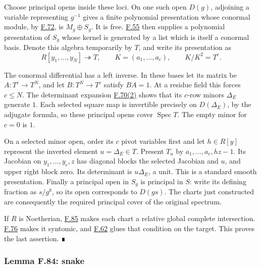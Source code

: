 \documentclass[11pt,a4paper,openany]{report}
\begin{document}
Choose principal opens inside these loci. On one such open \(D(g)\), adjoining a variable representing \(g^{-1}\) gives a finite polynomial presentation whose conormal module, by \hyperref[AG-RG-S05-algebra-lemma-principal-localization-NL]{F.72}, is \(M_g\oplus S_g\). It is free. \hyperref[AG-RG-S05-algebra-lemma-huber]{F.55} then supplies a polynomial presentation of \(S_g\) whose kernel is generated by a list which is itself a conormal basis. Denote this algebra temporarily by \(T\), and write its presentation as \[
R[y_1,\ldots,y_N]\twoheadrightarrow T,
\qquad K=(a_1,\ldots,a_c),\qquad K/K^2=T^c.
\]

The conormal differential has a left inverse. In these bases let its matrix be \(A:T^c\to T^N\), and let \(B:T^N\to T^c\) satisfy \(BA=1\). At a residue field this forces \(c\le N\). The determinant expansion \hyperref[AG-RG-S05-algebra-lemma-matrix-left-inverse]{F.70(2)} shows that its \(c\)-row minors \(\Delta_E\) generate \(1\). Each selected square map is invertible precisely on \(D(\Delta_E)\), by the adjugate formula, so these principal opens cover \(\operatorname{Spec}T\). The empty minor for \(c=0\) is \(1\).

On a selected minor open, order its \(c\) pivot variables first and let \(h\in R[y]\) represent the inverted element \(u=\Delta_E\in T\). Present \(T_u\) by \(a_1,\ldots,a_c,hz-1\). Its Jacobian on \(y_1,\ldots,y_c,z\) has diagonal blocks the selected Jacobian and \(u\), and upper right block zero. Its determinant is \(u\Delta_E\), a unit. This is a standard smooth presentation. Finally a principal open in \(S_g\) is principal in \(S\): write its defining fraction as \(s/g^k\), so its open corresponds to \(D(gs)\). The charts just constructed are consequently the required principal cover of the original spectrum.

If \(R\) is Noetherian, \hyperref[AG-RG-S05-algebra-lemma-standard-smooth]{F.85} makes each chart a relative global complete intersection. \hyperref[AG-RG-S05-algebra-lemma-relative-global-complete-intersection]{F.76} makes it syntomic, and \hyperref[AG-RG-S05-algebra-lemma-local-syntomic]{F.62} glues that condition on the target. This proves the last assertion. ∎

\label{AG-RG-S05-algebra-lemma-snake}

\subsubsection{Lemma F.84: snake}\label{AG-RG-S05-lemma-f.84-snake}
\end{document}
